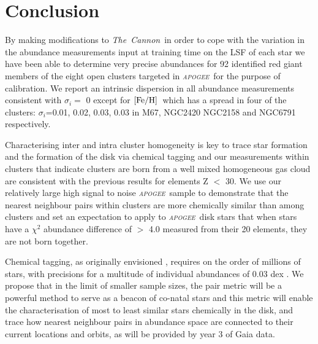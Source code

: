 \documentclass[14pt, preprint2]{aastex6}
\newcommand{\project}[1]{\textsl{#1}}
\newcommand{\tc}{\project{The~Cannon}}
\newcommand{\apogee}{\project{\textsc{apogee}}}
\newcommand{\feh}{\mbox{$\rm [Fe/H]$}}
\begin{document}



\section{Conclusion}


By making modifications to \tc\ in order to cope with the variation in the abundance measurements input at training time on the LSF of each star we have been able to determine very precise abundances for 92 identified red giant members of the eight open clusters targeted in \apogee\ for the purpose of calibration. We report an intrinsic dispersion in all abundance measurements consistent with $\sigma_i=$ 0 except for \feh\ which has a spread in four of the clusters: $\sigma_i$=0.01, 0.02,  0.03, 0.03 in M67, NGC2420 NGC2158 and NGC6791 respectively. 

Characterising inter and intra cluster homogeneity is key to trace star formation and the formation of the disk via chemical tagging and our measurements within clusters that indicate clusters are born from a well mixed homogeneous gas cloud are consistent with the previous results for elements Z $<$ 30. We use our relatively large high signal to noise \apogee\ sample to demonstrate that the nearest neighbour pairs within clusters are more chemically similar than among clusters and set an expectation to apply to \apogee\ disk stars that when stars have a $\chi^2$ abundance difference of $>$ 4.0 measured from their 20 elements, they are not born together. 

Chemical tagging, as originally envisioned \citep{freeman2002}, requires on the 
order of millions of stars, with precisions for a multitude of individual 
abundances of 0.03 dex \citep{Ting2015}. We propose that in the limit of smaller sample sizes, the pair metric will be a powerful method to serve as a beacon of co-natal stars and this metric will enable the characterisation of most to least similar stars chemically in the disk, and trace how nearest neighbour pairs in abundance space are connected to their current locations and orbits, as will be provided by year 3 of Gaia data. 

\end{document}

